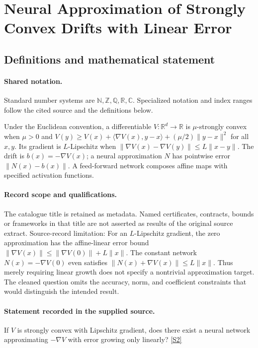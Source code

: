 \documentclass[11pt]{article}
\newcommand{\sref}[2]{\hyperlink{source:#1:#2}{[S#2]}}
\begin{document}
\section{Neural Approximation of Strongly Convex Drifts with Linear Error}\label{statement}

\subsection{Definitions and mathematical statement}

\paragraph{Shared notation.}Standard number systems are $\mathbb N,\mathbb Z,\mathbb Q,\mathbb R,\mathbb C$. Specialized notation and index ranges follow the cited source and the definitions below.


Under the Euclidean convention, a differentiable $V:\mathbb R^d\to\mathbb R$ is $\mu$-strongly convex when $\mu>0$ and $V(y)\ge V(x)+\langle\nabla V(x),y-x\rangle+(\mu/2)\|y-x\|^2$ for all $x,y$. Its gradient is $L$-Lipschitz when $\|\nabla V(x)-\nabla V(y)\|\le L\|x-y\|$. The drift is $b(x)=-\nabla V(x)$; a neural approximation $N$ has pointwise error $\|N(x)-b(x)\|$. A feed-forward network composes affine maps with specified activation functions.
\paragraph{Record scope and qualifications.}
The catalogue title is retained as metadata. Named certificates, contracts, bounds or frameworks in that title are not asserted as results of the original source extract.
Source-record limitation: For an $L$-Lipschitz gradient, the zero approximation has the affine-linear error bound $\|\nabla V(x)\|\le\|\nabla V(0)\|+L\|x\|$. The constant network $N(x)=-\nabla V(0)$ even satisfies $\|N(x)+\nabla V(x)\|\le L\|x\|$. Thus merely requiring linear growth does not specify a nontrivial approximation target. The cleaned question omits the accuracy, norm, and coefficient constraints that would distinguish the intended result.
\paragraph{Statement recorded in the supplied source.}
If $V$ is strongly convex with Lipschitz gradient, does there exist a neural network approximating $-\nabla V$ with error growing only linearly? \sref{statement}{2}
\end{document}
